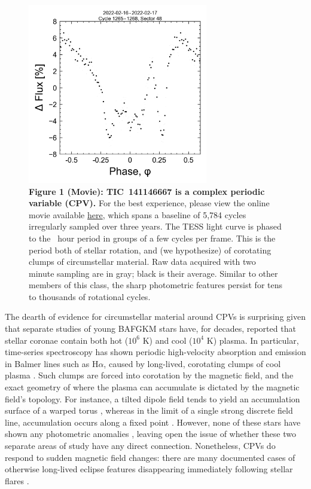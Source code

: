 \documentclass{nature3}
\begin{document}
\begin{figure}[!t]
  \centering
  \includegraphics[width=0.7\textwidth]{figures/f1.png}
  \caption[]{{\bf Figure 1 (Movie):  TIC~141146667 is a complex periodic
  variable (CPV).} For the best experience, please view the online movie
  available
  \href{https://lgbouma.com/movies/movie_TIC1411_flux_phase.mp4}{here},
  which spans a baseline of 5{,}784 cycles irregularly sampled over three
  years.  The TESS light curve is phased to the \periodhr\ hour period in
  groups of a few cycles per frame.  This is the period both of
  stellar rotation, and (we hypothesize) of corotating clumps of
  circumstellar material.  Raw data acquired with two minute
  sampling are in gray; black is their average.  Similar to other members
  of this class, the sharp photometric features persist for tens to
  thousands of rotational cycles. }
  \label{fig:lc}
\end{figure}


The dearth of evidence for circumstellar material around CPVs is
surprising given that separate studies of young BAFGKM stars have, for
decades, reported that stellar coronae contain both hot ($10^6$ K) and
cool ($10^4$ K) plasma. In particular, time-series spectroscopy has
shown periodic high-velocity absorption and emission in Balmer lines
such as H$\alpha$, caused by long-lived, corotating clumps of cool
plasma \cite{CollierCameron1989,Donati2000,Dunstone2006,Skelly2008}.
Such clumps are forced into corotation by the magnetic field, and the
exact geometry of where the plasma can accumulate is dictated by the
magnetic field's topology.  For instance, a tilted dipole field tends
to yield an accumulation surface of a warped torus
\cite{Townsend2005}, whereas in the limit of a single strong discrete
field line, accumulation occurs along a fixed point \cite{Waugh2022}.
However, none of these stars have shown any photometric anomalies
\cite{Bouma2024}, leaving open the issue of whether these two separate
areas of study have any direct connection.  Nonetheless, CPVs do
respond to sudden magnetic field changes: there are many documented
cases of otherwise long-lived eclipse features disappearing
immediately following stellar flares \cite{Stauffer2017,Bouma2024}.
\end{document}
